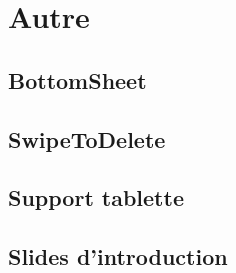 \section{Autre}

\subsection{BottomSheet}

\subsection{SwipeToDelete}

\subsection{Support tablette}

\subsection{Slides d'introduction}








